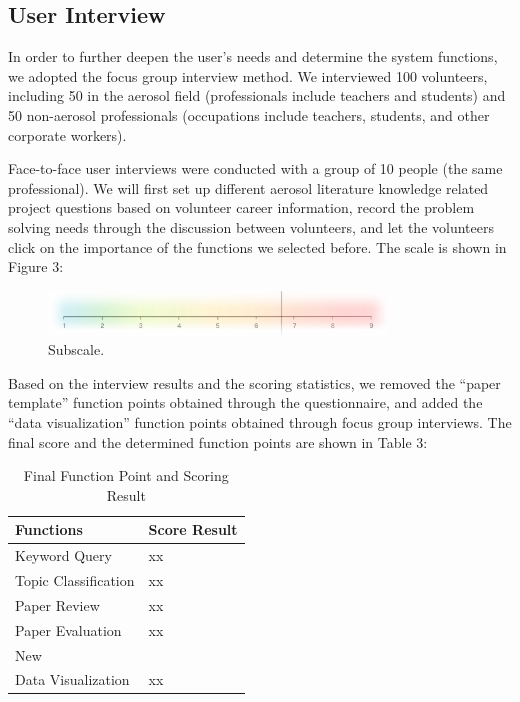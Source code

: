 \subsection{User Interview}
In order to further deepen the user's needs and determine the system functions, we adopted the focus group interview method. We interviewed 100 volunteers, including 50 in the aerosol field (professionals include teachers and students) and 50 non-aerosol professionals (occupations include teachers, students, and other corporate workers). 

Face-to-face user interviews were conducted with a group of 10 people (the same professional). We will first set up different aerosol literature knowledge related project questions based on volunteer career information, record the problem solving needs through the discussion between volunteers, and let the volunteers click on the importance of the functions we selected before. The scale is shown in Figure 3:

\begin{figure}
	\includegraphics[width=0.8\textwidth]{pic3.pdf}
	\caption{Subscale.}
\end{figure}

Based on the interview results and the scoring statistics, we removed the “paper template” function points obtained through the questionnaire, and added the “data visualization” function points obtained through focus group interviews. The final score and the determined function points are shown in Table 3:

\begin{table}
	\caption{Final Function Point and Scoring Result}
	\label{tab:freq}
	\begin{tabular}{ll}
		\toprule
		Functions&Score Result\\
		\midrule
		Keyword Query & xx\\
		Topic Classification & xx\\
		Paper Review & xx\\
		Paper Evaluation & xx\\
		\midrule
		New\\
		Data Visualization & xx\\
		\bottomrule
	\end{tabular}
\end{table}

